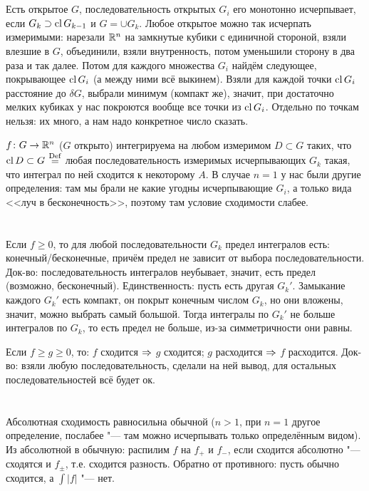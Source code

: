 \section{} %
Есть открытое $G$, последовательность открытых $G_i$ его монотонно исчерпывает, если $G_k \supset \operatorname{cl} G_{k-1}$ и $G=\cup G_k$.
Любое открытое можно так исчерпать измеримыми: нарезали $\mathbb{R}^n$ на замкнутые кубики с единичной стороной, взяли влезшие в $G$, объединили, взяли внутренность,
потом уменьшили сторону в два раза и так далее.
Потом для каждого множества $G_i$ найдём следующее, покрывающее $\operatorname{cl} G_i$ (а между ними всё выкинем).
Взяли для каждой точки $\operatorname{cl} G_i$ расстояние до $\delta G$, выбрали минимум (компакт же), значит, при достаточно мелких кубиках у нас покроются вообще все точки из $\operatorname{cl} G_i$.
Отдельно по точкам нельзя: их много, а нам надо конкретное число сказать.

$f \colon G \to \mathbb{R}^n$ ($G$ открыто) интегрируема на любом измеримом $D \subset G$ таких, что $\operatorname{cl} D \subset G$ $\stackrel{\mathrm{Def}}{=}$
любая последовательность измеримых исчерпывающих $G_k$ такая, что интеграл по ней сходится к некоторому $A$.
В случае $n=1$ у нас были другие определения: там мы брали не какие угодны исчерпывающие $G_i$, а только вида <<луч в бесконечность>>,
поэтому там условие сходимости слабее.

\section{} %
Если $f \ge 0$, то для любой последовательности $G_k$ предел интегралов есть: конечный/бесконечные, причём предел не зависит от выбора последовательности.
Док-во: последовательность интегралов неубывает, значит, есть предел (возможно, бесконечный).
Единственность: пусть есть другая $G_k'$.
Замыкание каждого $G_k'$ есть компакт, он покрыт конечным числом $G_k$, но они вложены, значит, можно выбрать самый большой.
Тогда интегралы по $G_k'$ не больше интегралов по $G_k$, то есть предел не больше, из-за симметричности они равны.

Если $f \ge g \ge 0$, то: $f$ сходится $\Rightarrow$ $g$ сходится; $g$ расходится $\Rightarrow$ $f$ расходится.
Док-во: взяли любую последовательность, сделали на ней вывод, для остальных последовательностей всё будет ок.

\section{} %
Абсолютная сходимость равносильна обычной ($n>1$, при $n=1$ другое определение, послабее "--- там можно исчерпывать только определённым видом).
Из абсолютной в обычную: распилим $f$ на $f_+$ и $f_-$, если сходится абсолютно "--- сходятся и $f_\pm$, т.е. сходится разность.
Обратно от противного: пусть обычно сходится, а $\int |f|$ "--- нет.
\TODO %
